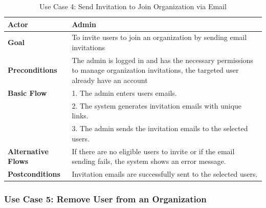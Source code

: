 \begin{table}[ht]
	\centering
	\begin{tabularx}{\textwidth}{|l|X|}
		\hline
		\textbf{Actor}             & Admin                                                                                                                                  \\
		\hline
		\textbf{Goal}              & To invite users to join an organization by sending email invitations                                                                   \\
		\hline
		\textbf{Preconditions}     & The admin is logged in and has the necessary permissions to manage organization invitations, the targeted user already have an account \\
		\hline
		\textbf{Basic Flow}        & 1. The admin enters users emails.                                                                                                      \\
		                           & 2. The system generates invitation emails with unique links.                                                                           \\
		                           & 3. The admin sends the invitation emails to the selected users.                                                                        \\
		\hline
		\textbf{Alternative Flows} & If there are no eligible users to invite or if the email sending fails, the system shows an error message.                             \\
		\hline
		\textbf{Postconditions}    & Invitation emails are successfully sent to the selected users.                                                                         \\
		\hline
	\end{tabularx}
	\caption{Use Case 4: Send Invitation to Join Organization via Email}
	\label{tab:Use Case 4 Send Invitation}
\end{table}

\subsubsection{Use Case 5: Remove User from an Organization}

